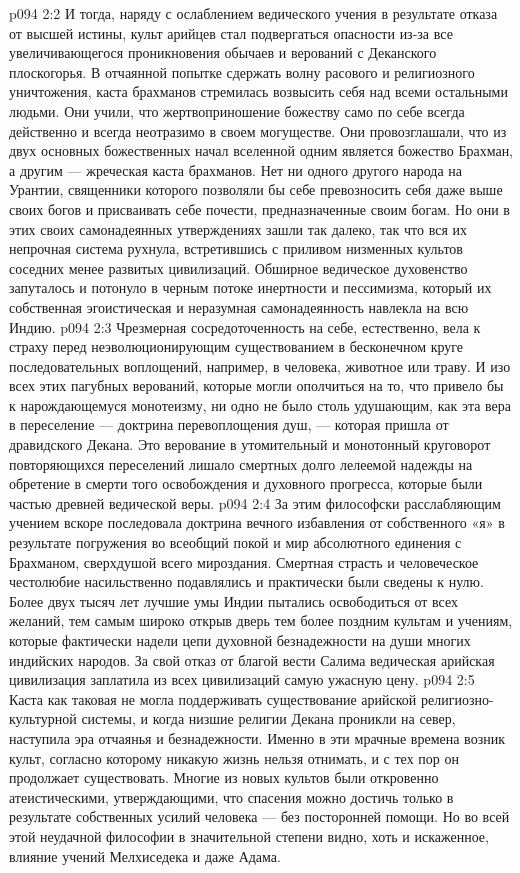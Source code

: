 \vs p094 2:2 И тогда, наряду с ослаблением ведического учения в результате отказа от высшей истины, культ арийцев стал подвергаться опасности из\hyp{}за все увеличивающегося проникновения обычаев и верований с Деканского плоскогорья. В отчаянной попытке сдержать волну расового и религиозного уничтожения, каста брахманов стремилась возвысить себя над всеми остальными людьми. Они учили, что жертвоприношение божеству само по себе всегда действенно и всегда неотразимо в своем могуществе. Они провозглашали, что из двух основных божественных начал вселенной одним является божество Брахман, а другим --- жреческая каста брахманов. Нет ни одного другого народа на Урантии, священники которого позволяли бы себе превозносить себя даже выше своих богов и присваивать себе почести, предназначенные своим богам. Но они в этих своих самонадеянных утверждениях зашли так далеко, так что вся их непрочная система рухнула, встретившись с приливом низменных культов соседних менее развитых цивилизаций. Обширное ведическое духовенство запуталось и потонуло в черным потоке инертности и пессимизма, который их собственная эгоистическая и неразумная самонадеянность навлекла на всю Индию.
\vs p094 2:3 Чрезмерная сосредоточенность на себе, естественно, вела к страху перед неэволюционирующим существованием в бесконечном круге последовательных воплощений, например, в человека, животное или траву. И изо всех этих пагубных верований, которые могли ополчиться на то, что привело бы к нарождающемуся монотеизму, ни одно не было столь удушающим, как эта вера в переселение --- доктрина перевоплощения душ, --- которая пришла от дравидского Декана. Это верование в утомительный и монотонный круговорот повторяющихся переселений лишало смертных долго лелеемой надежды на обретение в смерти того освобождения и духовного прогресса, которые были частью древней ведической веры.
\vs p094 2:4 За этим философски расслабляющим учением вскоре последовала доктрина вечного избавления от собственного «я» в результате погружения во всеобщий покой и мир абсолютного единения с Брахманом, сверхдушой всего мироздания. Смертная страсть и человеческое честолюбие насильственно подавлялись и практически были сведены к нулю. Более двух тысяч лет лучшие умы Индии пытались освободиться от всех желаний, тем самым широко открыв дверь тем более поздним культам и учениям, которые фактически надели цепи духовной безнадежности на души многих индийских народов. За свой отказ от благой вести Салима ведическая арийская цивилизация заплатила из всех цивилизаций самую ужасную цену.
\vs p094 2:5 \pc Каста как таковая не могла поддерживать существование арийской религиозно\hyp{}культурной системы, и когда низшие религии Декана проникли на север, наступила эра отчаянья и безнадежности. Именно в эти мрачные времена возник культ, согласно которому никакую жизнь нельзя отнимать, и с тех пор он продолжает существовать. Многие из новых культов были откровенно атеистическими, утверждающими, что спасения можно достичь только в результате собственных усилий человека --- без посторонней помощи. Но во всей этой неудачной философии в значительной степени видно, хоть и искаженное, влияние учений Мелхиседека и даже Адама.
